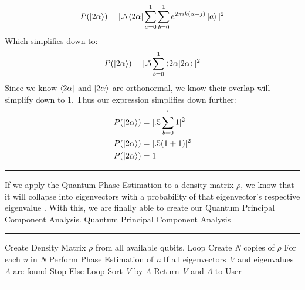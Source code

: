 \documentclass[conference]{IEEEtran}
\begin{document}
\begin{align*}
P(\ket{2 \alpha}) = |.5 \bra{2 \alpha}\sum_{a = 0}^1 \sum_{b = 0}^1 e^{2\pi i k(\alpha - j)}\ket{a} |^2
\end{align*} 
Which simplifies down to:
\begin{align*}
P(\ket{2 \alpha}) = |.5  \sum_{b = 0}^1  \bra{2 \alpha}\ket{2 \alpha}|^2
\end{align*} 
Since we know $\bra{2 \alpha}$ and $\ket{2 \alpha}$ are orthonormal, we know their overlap will simplify down to 1. Thus our expression simplifies down further: 
\begin{align*}
& P(\ket{2 \alpha}) = |.5  \sum_{b = 0}^1  1|^2 \\
& P(\ket{2 \alpha}) = |.5  (1+1)|^2 \\
& P(\ket{2 \alpha}) = 1 \\
\end{align*} 
\noindent\rule{\columnwidth}{1pt}
\indent If we apply the Quantum Phase Estimation to a density matrix $\rho$, we know that it will collapse into eigenvectors with a probability of that eigenvector's respective eigenvalue \cite{b6}. \newline
\indent With this, we are finally able to create our Quantum Principal Component Analysis. \newline \newline
{\large Quantum Principal Component Analysis} \newline
\noindent\rule{\columnwidth}{1pt}
Create Density Matrix $\rho$ from all available qubits. \newline
Loop \newline
\indent Create \emph{N} copies of $\rho$ \newline
\indent For each \emph{n} in \emph{N} \newline 
\indent \indent Perform Phase Estimation of \emph{n} \newline 
\indent If  all eigenvectors \emph{V} and eigenvalues $\Lambda$ are found \newline 
\indent \indent Stop \newline 
\indent Else \newline 
\indent\indent Loop \newline 
Sort \emph{V} by $\Lambda$ \newline 
Return \emph{V} and $\Lambda$ to User \newline 
\noindent\rule{\columnwidth}{1pt}
\cite{b7}
\end{document}
